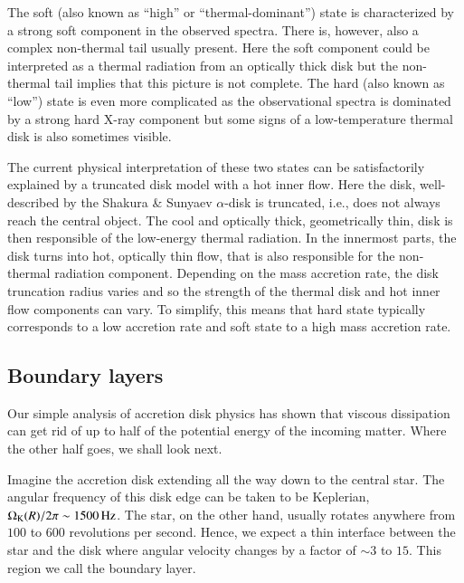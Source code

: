 The soft (also known as ``high'' or ``thermal-dominant'') state is characterized by a strong soft component in the observed spectra.\cite[see e.g.,][]{GZP99}
There is, however, also a complex non-thermal tail usually present.\cite{MRC00}
Here the soft component could be interpreted as a thermal radiation from an optically thick disk but the non-thermal tail implies that this picture is not complete.
The hard (also known as ``low'') state is even more complicated as the observational spectra is dominated by a strong hard X-ray component but some signs of a low-temperature thermal disk is also sometimes visible.\cite{ZG04}

The current physical interpretation of these two states can be satisfactorily explained by a truncated disk model with a hot inner flow.
Here the disk, well-described by the Shakura \& Sunyaev $\alpha$-disk is truncated, i.e., does not always reach the central object.
The cool and optically thick, geometrically thin, disk is then responsible of the low-energy thermal radiation.
In the innermost parts, the disk turns into hot, optically thin flow, that is also responsible for the non-thermal radiation component.
Depending on the mass accretion rate, the disk truncation radius varies and so the strength of the thermal disk and hot inner flow components can vary.
To simplify, this means that hard state typically corresponds to a low accretion rate and soft state to a high mass accretion rate.


\subsection{Boundary layers}

Our simple analysis of accretion disk physics has shown that viscous dissipation can get rid of up to half of the potential energy of the incoming matter.
Where the other half goes, we shall look next.

Imagine the accretion disk extending all the way down to the central star.
The angular frequency of this disk edge can be taken to be Keplerian, $\Omega_{\mathrm{K}}(R)/2\pi \sim 1500 \,\mathrm{Hz}$.
The star, on the other hand, usually rotates anywhere from $100$ to $600$ revolutions per second.\cite{Watts12, PTR14}
Hence, we expect a thin interface between the star and the disk where angular velocity changes by a factor of $\sim 3$ to $15$.
This region we call the boundary layer.

